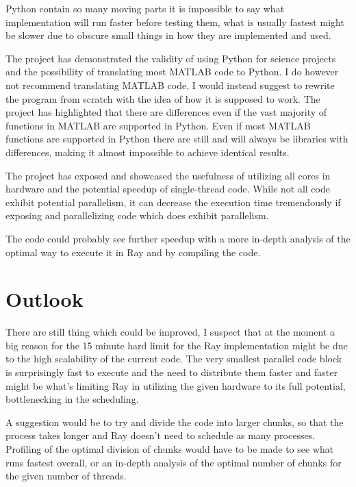 \documentclass[12pt, a4paper]{article}
\begin{document}
Python contain so many moving parts it is impossible to say what implementation will run faster before testing them, what is usually fastest might be slower due to obscure small things in how they are implemented and used.

The project has demonstrated the validity of using Python for science projects and the possibility of translating most MATLAB code to Python.
I do however not recommend translating MATLAB code, I would instead suggest to rewrite the program from scratch with the idea of how it is supposed to work.
The project has highlighted that there are differences even if the vast majority of functions in MATLAB are supported in Python.
Even if most MATLAB functions are supported in Python there are still and will always be libraries with differences, making it almost impossible to achieve identical results.

The project has exposed and showcased the usefulness of utilizing all cores in hardware and the potential speedup of single-thread code.
While not all code exhibit potential parallelism, it can decrease the execution time tremendously if exposing and parallelizing code which does exhibit parallelism.

The code could probably see further speedup with a more in-depth analysis of the optimal way to execute it in Ray and by compiling the code.


\section{Outlook}

There are still thing which could be improved, I suspect that at the moment a big reason for the 15 minute hard limit for the Ray implementation might be due to the high scalability of the current code.
The very smallest parallel code block is surprisingly fast to execute and the need to distribute them faster and faster might be what's limiting Ray in utilizing the given hardware to its full potential, bottlenecking in the scheduling.

A suggestion would be to try and divide the code into larger chunks, so that the process takes longer and Ray doesn't need to schedule as many processes.
Profiling of the optimal division of chunks would have to be made to see what runs fastest overall, or an in-depth analysis of the optimal number of chunks for the given number of threads.
\end{document}

